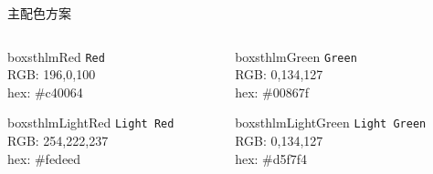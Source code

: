 \documentclass[newPxFont,sthlmFooter]{beamer}
\begin{document}
\begin{frame}[c]{主配色方案}
\begin{columns}[c]
\begin{column}{0.23\textwidth}

\begin{beamercolorbox}[wd=\linewidth,ht=10ex,dp=3ex]{boxsthlmRed}
\centering
	\texttt{Red}\\
	\vspace{1em}
	\tiny{RGB:  196,0,100} \\
	\tiny{hex: \#c40064}
\end{beamercolorbox}

\vspace{3em}

\begin{beamercolorbox}[wd=\linewidth,ht=10ex,dp=3ex]{boxsthlmLightRed}
\centering
	\texttt{Light Red}\\
	\vspace{1em}
	\tiny{RGB:  254,222,237} \\
	\tiny{hex: \#fedeed}
\end{beamercolorbox}
\end{column}


\begin{column}{0.23\textwidth}
\begin{beamercolorbox}[wd=\linewidth,ht=10ex,dp=3ex]{boxsthlmGreen}
\centering
	\texttt{Green}\\
	\vspace{1em}
	\tiny{RGB:  0,134,127} \\
	\tiny{hex: \#00867f}
\end{beamercolorbox}

\vspace{3em}

\begin{beamercolorbox}[wd=\linewidth,ht=10ex,dp=3ex]{boxsthlmLightGreen}
\centering
	\texttt{Light Green}\\
	\vspace{1em}
	\tiny{RGB:  0,134,127} \\
	\tiny{hex: \#d5f7f4}
\end{beamercolorbox}
\end{column}
\end{columns}


\end{frame}
\end{document}
